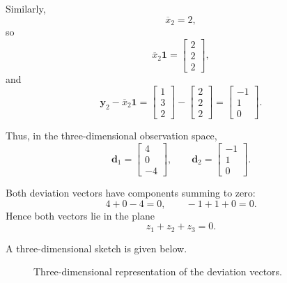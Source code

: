 \documentclass[12pt,a4paper]{article}
\begin{document}
Similarly,
\[
\overline{x}_2=2,
\]
so
\[
\overline{x}_2\mathbf{1}
=
\begin{bmatrix}
2\\2\\2
\end{bmatrix},
\]
and
\[
\mathbf{y}_2-\overline{x}_2\mathbf{1}
=
\begin{bmatrix}
1\\3\\2
\end{bmatrix}
-
\begin{bmatrix}
2\\2\\2
\end{bmatrix}
=
\boxed{
\begin{bmatrix}
-1\\1\\0
\end{bmatrix}}.
\]

Thus, in the three-dimensional observation space,
\[
\boxed{
\mathbf{d}_1=
\begin{bmatrix}
4\\0\\-4
\end{bmatrix},
\qquad
\mathbf{d}_2=
\begin{bmatrix}
-1\\1\\0
\end{bmatrix}.
}
\]

Both deviation vectors have components summing to zero:
\[
4+0-4=0,
\qquad
-1+1+0=0.
\]
Hence both vectors lie in the plane
\[
z_1+z_2+z_3=0.
\]

A three-dimensional sketch is given below.

\begin{figure}[H]
\centering
{}
\caption{Three-dimensional representation of the deviation vectors.}
\end{figure}
\end{document}
